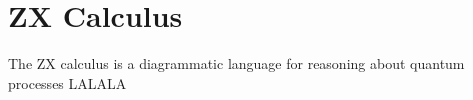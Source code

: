 \chapter{\label{zx-calculus}ZX Calculus}

The ZX calculus is a diagrammatic language for reasoning about quantum processes LALALA
